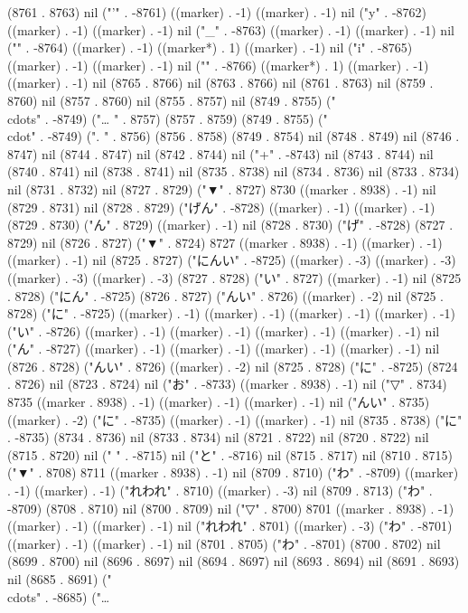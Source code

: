 (8761 . 8763) nil ("'" . -8761) ((marker) . -1) ((marker) . -1) nil ("y" . -8762) ((marker) . -1) ((marker) . -1) nil ("_" . -8763) ((marker) . -1) ((marker) . -1) nil ("{" . -8764) ((marker) . -1) ((marker*) . 1) ((marker) . -1) nil ("i" . -8765) ((marker) . -1) ((marker) . -1) nil ("}" . -8766) ((marker*) . 1) ((marker) . -1) ((marker) . -1) nil (8765 . 8766) nil (8763 . 8766) nil (8761 . 8763) nil (8759 . 8760) nil (8757 . 8760) nil (8755 . 8757) nil (8749 . 8755) ("\\cdots" . -8749) ("…
" . 8757) (8757 . 8759) (8749 . 8755) ("\\cdot" . -8749) (".
" . 8756) (8756 . 8758) (8749 . 8754) nil (8748 . 8749) nil (8746 . 8747) nil (8744 . 8747) nil (8742 . 8744) nil ("+" . -8743) nil (8743 . 8744) nil (8740 . 8741) nil (8738 . 8741) nil (8735 . 8738) nil (8734 . 8736) nil (8733 . 8734) nil (8731 . 8732) nil (8727 . 8729) ("▼" . 8727) 8730 ((marker . 8938) . -1) nil (8729 . 8731) nil (8728 . 8729) ("げん" . -8728) ((marker) . -1) ((marker) . -1) (8729 . 8730) ("ん" . 8729) ((marker) . -1) nil (8728 . 8730) ("げ" . -8728) (8727 . 8729) nil (8726 . 8727) ("▼" . 8724) 8727 ((marker . 8938) . -1) ((marker) . -1) ((marker) . -1) nil (8725 . 8727) ("にんい" . -8725) ((marker) . -3) ((marker) . -3) ((marker) . -3) ((marker) . -3) (8727 . 8728) ("い" . 8727) ((marker) . -1) nil (8725 . 8728) ("にん" . -8725) (8726 . 8727) ("んい" . 8726) ((marker) . -2) nil (8725 . 8728) ("に" . -8725) ((marker) . -1) ((marker) . -1) ((marker) . -1) ((marker) . -1) ("い" . -8726) ((marker) . -1) ((marker) . -1) ((marker) . -1) ((marker) . -1) nil ("ん" . -8727) ((marker) . -1) ((marker) . -1) ((marker) . -1) ((marker) . -1) nil (8726 . 8728) ("んい" . 8726) ((marker) . -2) nil (8725 . 8728) ("に" . -8725) (8724 . 8726) nil (8723 . 8724) nil ("お" . -8733) ((marker . 8938) . -1) nil ("▽" . 8734) 8735 ((marker . 8938) . -1) ((marker) . -1) ((marker) . -1) nil ("んい" . 8735) ((marker) . -2) ("に" . -8735) ((marker) . -1) ((marker) . -1) nil (8735 . 8738) ("に" . -8735) (8734 . 8736) nil (8733 . 8734) nil (8721 . 8722) nil (8720 . 8722) nil (8715 . 8720) nil (" " . -8715) nil ("と" . -8716) nil (8715 . 8717) nil (8710 . 8715) ("▼" . 8708) 8711 ((marker . 8938) . -1) nil (8709 . 8710) ("わ" . -8709) ((marker) . -1) ((marker) . -1) ("れわれ" . 8710) ((marker) . -3) nil (8709 . 8713) ("わ" . -8709) (8708 . 8710) nil (8700 . 8709) nil ("▽" . 8700) 8701 ((marker . 8938) . -1) ((marker) . -1) ((marker) . -1) nil ("れわれ" . 8701) ((marker) . -3) ("わ" . -8701) ((marker) . -1) ((marker) . -1) nil (8701 . 8705) ("わ" . -8701) (8700 . 8702) nil (8699 . 8700) nil (8696 . 8697) nil (8694 . 8697) nil (8693 . 8694) nil (8691 . 8693) nil (8685 . 8691) ("\\cdots" . -8685) ("…
